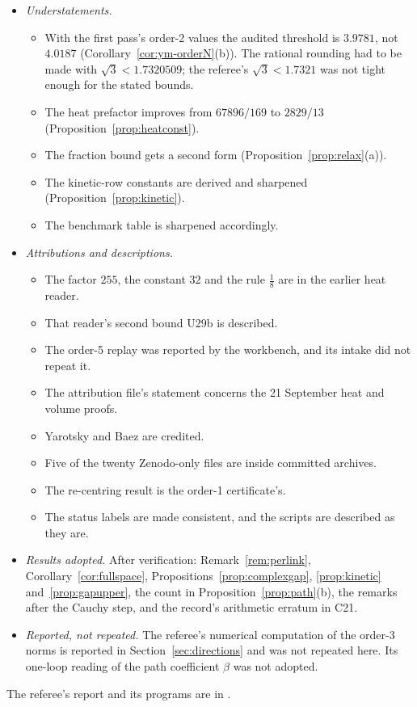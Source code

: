 \begin{itemize}
\item \emph{Understatements.}
\begin{itemize}
\item With the first pass's order-2 values the audited threshold is $3.9781$, not $4.0187$ (Corollary~\ref{cor:ym-orderN}(b)). The rational rounding had to be made with $\sqrt3<1.7320509$; the referee's $\sqrt3<1.7321$ was not tight enough for the stated bounds.
\item The heat prefactor improves from $67896/169$ to $2829/13$ (Proposition~\ref{prop:heatconst}).
\item The fraction bound gets a second form (Proposition~\ref{prop:relax}(a)).
\item The kinetic-row constants are derived and sharpened (Proposition~\ref{prop:kinetic}).
\item The benchmark table is sharpened accordingly.
\end{itemize}
\item \emph{Attributions and descriptions.}
\begin{itemize}
\item The factor $255$, the constant $32$ and the rule $\frac18$ are in the earlier heat reader.
\item That reader's second bound U29b is described.
\item The order-5 replay was reported by the workbench, and its intake did not repeat it.
\item The attribution file's statement concerns the 21 September heat and volume proofs.
\item Yarotsky and Baez are credited.
\item Five of the twenty Zenodo-only files are inside committed archives.
\item The re-centring result is the order-1 certificate's.
\item The status labels are made consistent, and the scripts are described as they are.
\end{itemize}
\item \emph{Results adopted.} After verification: Remark~\ref{rem:perlink}, Corollary~\ref{cor:fullspace}, Propositions~\ref{prop:complexgap}, \ref{prop:kinetic} and~\ref{prop:gapupper}, the count in Proposition~\ref{prop:path}(b), the remarks after the Cauchy step, and the record's arithmetic erratum in C21.
\item \emph{Reported, not repeated.} The referee's numerical computation of the order-3 norms is reported in Section~\ref{sec:directions} and was not repeated here. Its one-loop reading of the path coefficient $\beta$ was not adopted.
\end{itemize}
The referee's report and its programs are in .

